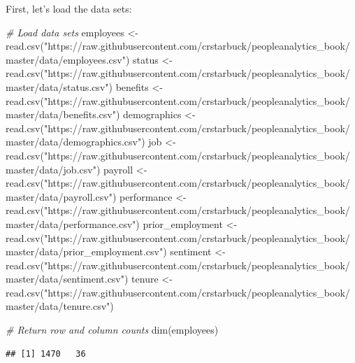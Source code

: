 \documentclass[
]{book}
\newenvironment{Shaded}{\begin{snugshade}}{\end{snugshade}}
\newcommand{\CommentTok}[1]{\textcolor[rgb]{0.56,0.35,0.01}{\textit{#1}}}
\newcommand{\FunctionTok}[1]{\textcolor[rgb]{0.00,0.00,0.00}{#1}}
\newcommand{\NormalTok}[1]{#1}
\newcommand{\OtherTok}[1]{\textcolor[rgb]{0.56,0.35,0.01}{#1}}
\newcommand{\StringTok}[1]{\textcolor[rgb]{0.31,0.60,0.02}{#1}}
\begin{document}
First, let's load the data sets:

\begin{Shaded}
\begin{Highlighting}[]
\CommentTok{\# Load data sets}
\NormalTok{employees }\OtherTok{\textless{}{-}} \FunctionTok{read.csv}\NormalTok{(}\StringTok{"https://raw.githubusercontent.com/crstarbuck/peopleanalytics\_book/master/data/employees.csv"}\NormalTok{)}
\NormalTok{status }\OtherTok{\textless{}{-}} \FunctionTok{read.csv}\NormalTok{(}\StringTok{"https://raw.githubusercontent.com/crstarbuck/peopleanalytics\_book/master/data/status.csv"}\NormalTok{)}
\NormalTok{benefits }\OtherTok{\textless{}{-}} \FunctionTok{read.csv}\NormalTok{(}\StringTok{"https://raw.githubusercontent.com/crstarbuck/peopleanalytics\_book/master/data/benefits.csv"}\NormalTok{)}
\NormalTok{demographics }\OtherTok{\textless{}{-}} \FunctionTok{read.csv}\NormalTok{(}\StringTok{"https://raw.githubusercontent.com/crstarbuck/peopleanalytics\_book/master/data/demographics.csv"}\NormalTok{)}
\NormalTok{job }\OtherTok{\textless{}{-}} \FunctionTok{read.csv}\NormalTok{(}\StringTok{"https://raw.githubusercontent.com/crstarbuck/peopleanalytics\_book/master/data/job.csv"}\NormalTok{)}
\NormalTok{payroll }\OtherTok{\textless{}{-}} \FunctionTok{read.csv}\NormalTok{(}\StringTok{"https://raw.githubusercontent.com/crstarbuck/peopleanalytics\_book/master/data/payroll.csv"}\NormalTok{)}
\NormalTok{performance }\OtherTok{\textless{}{-}} \FunctionTok{read.csv}\NormalTok{(}\StringTok{"https://raw.githubusercontent.com/crstarbuck/peopleanalytics\_book/master/data/performance.csv"}\NormalTok{)}
\NormalTok{prior\_employment }\OtherTok{\textless{}{-}} \FunctionTok{read.csv}\NormalTok{(}\StringTok{"https://raw.githubusercontent.com/crstarbuck/peopleanalytics\_book/master/data/prior\_employment.csv"}\NormalTok{)}
\NormalTok{sentiment }\OtherTok{\textless{}{-}} \FunctionTok{read.csv}\NormalTok{(}\StringTok{"https://raw.githubusercontent.com/crstarbuck/peopleanalytics\_book/master/data/sentiment.csv"}\NormalTok{)}
\NormalTok{tenure }\OtherTok{\textless{}{-}} \FunctionTok{read.csv}\NormalTok{(}\StringTok{"https://raw.githubusercontent.com/crstarbuck/peopleanalytics\_book/master/data/tenure.csv"}\NormalTok{)}

\CommentTok{\# Return row and column counts}
\FunctionTok{dim}\NormalTok{(employees)}
\end{Highlighting}
\end{Shaded}

\begin{verbatim}
## [1] 1470   36
\end{verbatim}
\end{document}
